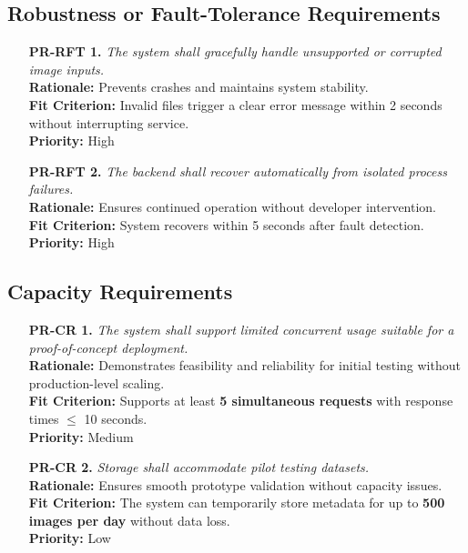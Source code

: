 \documentclass[12pt]{article}
\begin{document}
\subsection{Robustness or Fault-Tolerance Requirements}
\begin{itemize}
  \item[\textbf{PR-RFT 1.}] \textit{The system shall gracefully
    handle unsupported or corrupted image inputs.}\\
    \textbf{Rationale:} Prevents crashes and maintains system stability.\\
    \textbf{Fit Criterion:} Invalid files trigger a clear error
    message within 2 seconds without interrupting service.\\
    \textbf{Priority:} High

  \item[\textbf{PR-RFT 2.}] \textit{The backend shall recover
    automatically from isolated process failures.}\\
    \textbf{Rationale:} Ensures continued operation without developer
    intervention.\\
    \textbf{Fit Criterion:} System recovers within 5 seconds after
    fault detection.\\
    \textbf{Priority:} High
\end{itemize}

\subsection{Capacity Requirements}
\begin{itemize}
  \item[\textbf{PR-CR 1.}] \textit{The system shall support limited
    concurrent usage suitable for a proof-of-concept deployment.}\\
    \textbf{Rationale:} Demonstrates feasibility and reliability for
    initial testing without production-level scaling.\\
    \textbf{Fit Criterion:} Supports at least \textbf{5 simultaneous
    requests} with response times $\leq$ 10 seconds.\\
    \textbf{Priority:} Medium

  \item[\textbf{PR-CR 2.}] \textit{Storage shall accommodate pilot
    testing datasets.}\\
    \textbf{Rationale:} Ensures smooth prototype validation without
    capacity issues.\\
    \textbf{Fit Criterion:} The system can temporarily store metadata
    for up to \textbf{500 images per day} without data loss.\\
    \textbf{Priority:} Low
\end{itemize}
\end{document}
